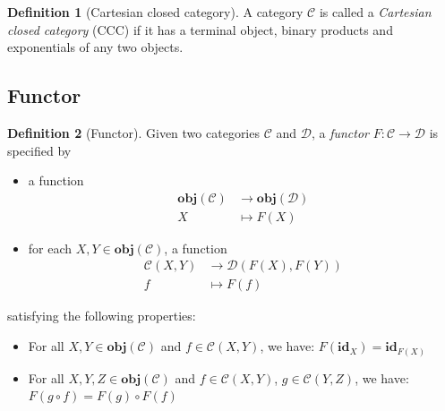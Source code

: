 \documentclass[12pt,a4paper]{report}
\theoremstyle{definition}
\newtheorem{definition}{Definition}[chapter]
\begin{document}
        \begin{definition}[Cartesian closed category]
            A category $\mathcal{C}$ is called a \emph{Cartesian closed category} (CCC) if it has a terminal object, binary products and exponentials of any two objects.
        \end{definition}

        
        \subsection{Functor}
        \begin{definition}[Functor]
            Given two categories $\mathcal{C}$ and $\mathcal{D}$, a \emph{functor} $F: \mathcal{C} \to \mathcal{D}$ is specified by
            \begin{itemize}
                \item 
                    a function 
                    \[\begin{aligned}
                        \textbf{obj}(\mathcal{C}) &\to \textbf{obj}(\mathcal{D}) \\
                        X &\mapsto F(X)
                    \end{aligned}\]

                \item 
                    for each $X, Y \in \textbf{obj}(\mathcal{C})$, a function 
                    \[\begin{aligned}
                        \mathcal{C}{(X,Y)} &\to \mathcal{D}{(F(X),F(Y))} \\
                        f &\mapsto F(f)
                    \end{aligned}\]
            \end{itemize}
            satisfying the following properties:
            \begin{itemize}
                \item 
                    For all $X, Y \in \textbf{obj}(\mathcal{C})$ and $f \in \mathcal{C}{(X,Y)}$, we have: $ F(\textbf{id}_X) = \textbf{id}_{F(X)}$
                \item
                    For all $X, Y, Z \in \textbf{obj}(\mathcal{C})$ and $f \in \mathcal{C}{(X,Y)}$, $g \in \mathcal{C}{(Y,Z)}$, we have: $F(g \circ f) = F(g) \circ F(f)$
            \end{itemize}
        \end{definition}

        
\end{document}
